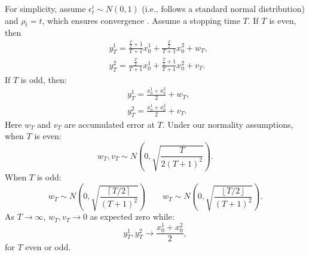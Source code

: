 \documentclass[aps,superscriptaddress,floatfix,amsmath,amssymb]{revtex4-2}
\begin{document}
For simplicity, assume $\epsilon^i_t \sim N(0,1)$ (i.e., follows a standard normal distribution) and $\rho_t = t$, which ensures convergence \cite{G21}. Assume a stopping time $T$. If $T$ is even, then
\begin{align}
&y^1_T = \frac{\tfrac{T}{2}+1}{T+1}x^1_0 + \frac{\tfrac{T}{2}}{T+1}x^2_0 + w_T,\label{eqn:Coeff1}\\
&y^2_T = \frac{\tfrac{T}{2}}{T+1}x^1_0 + \frac{\tfrac{T}{2}+1}{T+1}x^2_0 + v_T\label{eqn:Coeff2}.
\end{align}
If $T$ is odd, then:
\begin{align}
&y^1_T = \frac{x^1_0 + x^2_0}{2} + w_T,\label{eqn:Coeff3}\\
&y^2_T = \frac{x^1_0 + x^2_0}{2} + v_T\label{eqn:Coeff4}.
\end{align}
Here $w_T$ and $v_T$ are accumulated error at $T$. Under our normality assumptions, when $T$ is even:
\begin{equation}
w_T, v_T \sim N\left(0,\sqrt{\frac{T}{2(T+1)^2}}\right).
\label{eqn:ErrorDist1}
\end{equation}
When $T$ is odd:
\begin{equation}
w_T \sim N\left(0,\sqrt{\frac{\left\lceil{T/2}\right\rceil}{(T + 1)^2}}\right) \qquad
w_T \sim N\left(0,\sqrt{\frac{\left\lfloor{T/2}\right\rfloor}{(T + 1)^2}}\right).
\label{eqn:ErrorDist2}
\end{equation}
As $T \to \infty$, $w_T, v_T \to 0$ as expected zero while:
\begin{equation*}
y^1_T, y^2_T \to \frac{x^1_0 + x^2_0}{2},
\end{equation*}
for $T$ even or odd.
\end{document}
